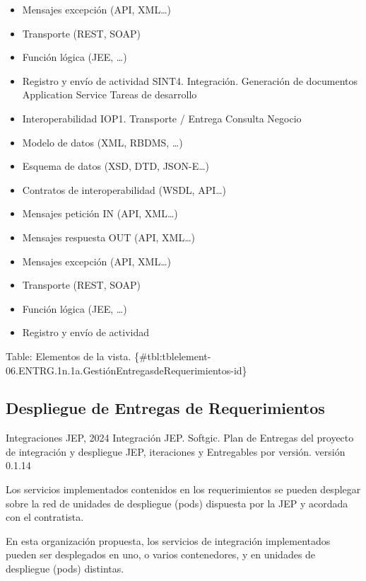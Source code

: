 \documentclass[
  paper=a4,
  ,captions=tableheading
]{scrartcl}
\renewenvironment{quote}{\begin{customblockquote}\list{}{\rightmargin=0em\leftmargin=0em}%
\item\relax\color{blockquote-text}\ignorespaces}{\unskip\unskip\endlist\end{customblockquote}}
\begin{document}
\begin{itemize}
\item
  Mensajes excepción (API, XML\ldots)
\item
  Transporte (REST, SOAP)
\item
  Función lógica (JEE, \ldots)
\item
  Registro y envío de actividad \textbar{} \textbar{} SINT4.
  Integración. Generación de documentos \textbar{} Application Service
  \textbar{} Tareas de desarrollo
\item
  Interoperabilidad IOP1. Transporte / Entrega Consulta Negocio
\item
  Modelo de datos (XML, RBDMS, \ldots)
\item
  Esquema de datos (XSD, DTD, JSON-E\ldots)
\item
  Contratos de interoperabilidad (WSDL, API\ldots)
\item
  Mensajes petición IN (API, XML\ldots)
\item
  Mensajes respuesta OUT (API, XML\ldots)
\item
  Mensajes excepción (API, XML\ldots)
\item
  Transporte (REST, SOAP)
\item
  Función lógica (JEE, \ldots)
\item
  Registro y envío de actividad \textbar{}
\end{itemize}

Table: Elementos de la vista.
\{\#tbl:tblelement-06.ENTRG.1n.1a.GestiónEntregasdeRequerimientos-id\}

\subsection{Despliegue de Entregas de
Requerimientos}\label{sec:despliegue-de-entregas-de-requerimientos}

\begin{quote}
Integraciones JEP, 2024 Integración JEP. Softgic. Plan de Entregas del
proyecto de integración y despliegue JEP, iteraciones y Entregables por
versión. versión 0.1.14
\end{quote}

Los servicios implementados contenidos en los requerimientos se pueden
desplegar sobre la red de unidades de despliegue (pods) dispuesta por la
JEP y acordada con el contratista.

En esta organización propuesta, los servicios de integración
implementados pueden ser desplegados en uno, o varios contenedores, y en
unidades de despliegue (pods) distintas.
\end{document}
